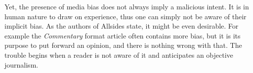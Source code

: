 Yet, the presence of media bias does not always imply a malicious intent. It is in human nature to draw on experience, thus one can simply not be aware of their implicit bias. As the authors of Allsides state, it might be even desirable. For example the \textit{Commentary} format article often contains more bias, but it is its purpose to put forward an opinion, and there is nothing wrong with that. The trouble begins when a reader is not aware of it and anticipates an objective journalism.




